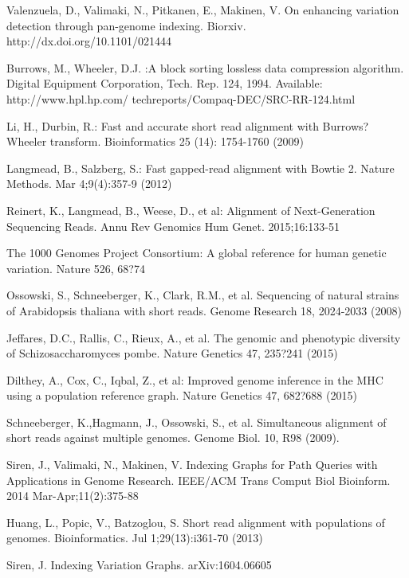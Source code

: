 \documentclass[runningheads,a4paper]{llncs}
\begin{document}
\begin{thebibliography}{4}

 Valenzuela, D., Valimaki, N., Pitkanen, E., Makinen, V. On enhancing variation detection through pan-genome indexing. Biorxiv. http://dx.doi.org/10.1101/021444

 Burrows, M., Wheeler, D.J. :A block sorting lossless data compression algorithm. Digital Equipment Corporation, Tech. Rep. 124, 1994. Available: http://www.hpl.hp.com/ techreports/Compaq-DEC/SRC-RR-124.html

 Li, H., Durbin, R.: Fast and accurate short read alignment with Burrows?Wheeler transform. Bioinformatics 25 (14): 1754-1760 (2009)

 Langmead, B., Salzberg, S.: Fast gapped-read alignment with Bowtie 2. Nature Methods. Mar 4;9(4):357-9 (2012)

 Reinert, K., Langmead, B., Weese, D., et al: Alignment of Next-Generation Sequencing Reads. Annu Rev Genomics Hum Genet. 2015;16:133-51

 The 1000 Genomes Project Consortium: A global reference for human genetic variation. Nature 526, 68?74

 Ossowski, S., Schneeberger, K., Clark, R.M., et al. Sequencing of natural strains of Arabidopsis thaliana with short reads. Genome Research 18, 2024-2033 (2008)

 Jeffares, D.C., Rallis, C., Rieux, A., et al. The genomic and phenotypic diversity of Schizosaccharomyces pombe. Nature Genetics 47, 235?241 (2015)

 Dilthey, A., Cox, C., Iqbal, Z., et al: Improved genome inference in the MHC using a population reference graph. Nature Genetics 47, 682?688 (2015)

 Schneeberger, K.,Hagmann, J., Ossowski, S.,  et al. Simultaneous alignment of short reads against multiple genomes. Genome Biol. 10, R98 (2009).

 Siren, J., Valimaki, N., Makinen, V. Indexing Graphs for Path Queries with Applications in Genome Research. IEEE/ACM Trans Comput Biol Bioinform. 2014 Mar-Apr;11(2):375-88

 Huang, L., Popic, V., Batzoglou, S. Short read alignment with populations of genomes. Bioinformatics. Jul 1;29(13):i361-70 (2013)

 Siren, J. Indexing Variation Graphs. 	arXiv:1604.06605 


\end{thebibliography}
\end{document}
